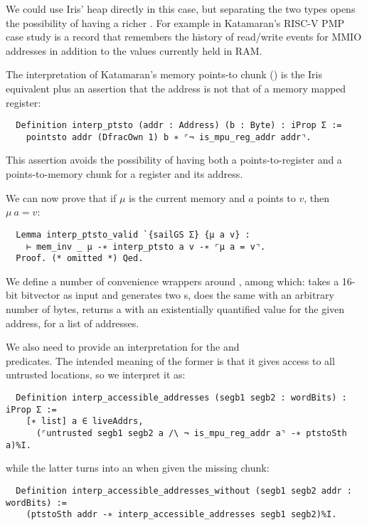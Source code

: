 We could use Iris' heap directly in this case, but separating the two types opens the possibility of having a richer . For example in Katamaran's RISC-V PMP case study  is a record that remembers the history of read/write events for MMIO addresses in addition to the values currently held in RAM.

The interpretation of Katamaran's memory points-to chunk () is the Iris equivalent plus an assertion that the address is not that of a memory mapped register:
\begin{verbatim}
  Definition interp_ptsto (addr : Address) (b : Byte) : iProp Σ :=
    pointsto addr (DfracOwn 1) b ∗ ⌜¬ is_mpu_reg_addr addr⌝.
\end{verbatim}
This assertion avoids the possibility of having both a points-to-register and a points-to-memory chunk for a register and its address.

We can now prove that if \(\mu\) is the current memory and \(a\) points to \(v\), then \(\mu~a = v\):
\begin{verbatim}
  Lemma interp_ptsto_valid `{sailGS Σ} {μ a v} :
    ⊢ mem_inv _ μ -∗ interp_ptsto a v -∗ ⌜μ a = v⌝.
  Proof. (* omitted *) Qed.
\end{verbatim}

We define a number of convenience wrappers around , among which:  takes a 16-bit bitvector as input and generates two s,  does the same with an arbitrary number of bytes,  returns a  with an existentially quantified value for the given address,  for a list of addresses.

We also need to provide an interpretation for the  and \\  predicates. The intended meaning of the former is that it gives access to all untrusted locations, so we interpret it as:
\begin{verbatim}
  Definition interp_accessible_addresses (segb1 segb2 : wordBits) : iProp Σ :=
    [∗ list] a ∈ liveAddrs,
      (⌜untrusted segb1 segb2 a /\ ¬ is_mpu_reg_addr a⌝ -∗ ptstoSth a)%I.
\end{verbatim}
while the latter turns into an  when given the missing chunk:
\begin{verbatim}
  Definition interp_accessible_addresses_without (segb1 segb2 addr : wordBits) :=
    (ptstoSth addr -∗ interp_accessible_addresses segb1 segb2)%I.
  \end{verbatim}

